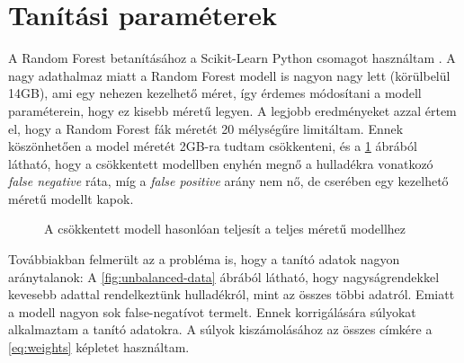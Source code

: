 \section{Tanítási paraméterek}
\label{ch:teaching-params}

A Random Forest betanításához a Scikit-Learn Python csomagot használtam \cite{scikit-learn}. A nagy adathalmaz miatt a Random Forest modell is nagyon nagy lett (körülbelül 14GB), ami egy nehezen kezelhető méret, így érdemes módosítani a modell paraméterein, hogy ez kisebb méretű legyen. A legjobb eredményeket azzal értem el, hogy a Random Forest fák méretét 20 mélységűre limitáltam. Ennek köszönhetően a model méretét 2GB-ra tudtam csökkenteni, és a \ref{fig:fullsize-vs-reduced} ábrából látható, hogy a csökkentett modellben enyhén megnő a hulladékra vonatkozó \textit{false negative} ráta, míg a \textit{false positive} arány nem nő, de cserében egy kezelhető méretű modellt kapok.

\begin{figure}[H]
	\centering
	\hspace{5pt}
	\hspace{5pt}
	\caption{A csökkentett modell hasonlóan teljesít a teljes méretű modellhez}
	\label{fig:fullsize-vs-reduced}
\end{figure}

Továbbiakban felmerült az a probléma is, hogy a tanító adatok nagyon aránytalanok: A \ref{fig:unbalanced-data} ábrából látható, hogy nagyságrendekkel kevesebb adattal rendelkeztünk hulladékról, mint az összes többi adatról. Emiatt a modell nagyon sok false-negatívot termelt. Ennek korrigálására súlyokat alkalmaztam a tanító adatokra. A súlyok kiszámolásához az összes címkére a \ref{eq:weights} képletet használtam.

\datacounts

